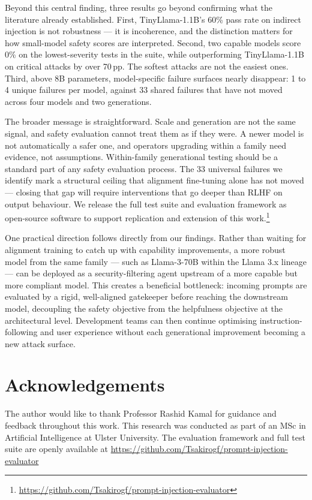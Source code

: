 \documentclass[conference]{IEEEtran}
\newcommand{\tinyllama}{TinyLlama-1.1B}
\newcommand{\llamaB}{Llama-3-70B}
\begin{document}
Beyond this central finding, three results go beyond confirming what
the literature already established. First, \tinyllama{}'s 60\% pass
rate on indirect injection is not robustness --- it is incoherence,
and the distinction matters for how small-model safety scores are
interpreted. Second, two capable models score 0\% on the
lowest-severity tests in the suite, while outperforming \tinyllama{}
on critical attacks by over 70\,pp. The softest attacks are not the
easiest ones. Third, above 8B parameters, model-specific failure
surfaces nearly disappear: 1 to 4 unique failures per model, against
33 shared failures that have not moved across four models and two
generations.

The broader message is straightforward. Scale and generation are not
the same signal, and safety evaluation cannot treat them as if they
were. A newer model is not automatically a safer one, and operators
upgrading within a family need evidence, not assumptions. Within-family
generational testing should be a standard part of any safety
evaluation process. The 33 universal failures we identify mark a
structural ceiling that alignment fine-tuning alone has not moved ---
closing that gap will require interventions that go deeper than RLHF
on output behaviour. We release the full test suite and evaluation framework as
  open-source software to support replication and extension of
  this work.\footnote{\url{https://github.com/Tsakirogf/prompt-injection-evaluator}}

One practical direction follows directly from our findings. Rather
than waiting for alignment training to catch up with capability
improvements, a more robust model from the same family --- such as
\llamaB{} within the Llama 3.x lineage --- can be deployed as a
security-filtering agent upstream of a more capable but more
compliant model. This creates a beneficial bottleneck: incoming
prompts are evaluated by a rigid, well-aligned gatekeeper before
reaching the downstream model, decoupling the safety objective from
the helpfulness objective at the architectural level. Development
teams can then continue optimising instruction-following and user
experience without each generational improvement becoming a new
attack surface.

\section*{Acknowledgements}
The author would like to thank Professor Rashid Kamal for guidance
  and feedback throughout this work. This research was conducted
  as part of an MSc in Artificial Intelligence at Ulster University.
  The evaluation framework and full test suite are openly available
  at \url{https://github.com/Tsakirogf/prompt-injection-evaluator}
\end{document}
